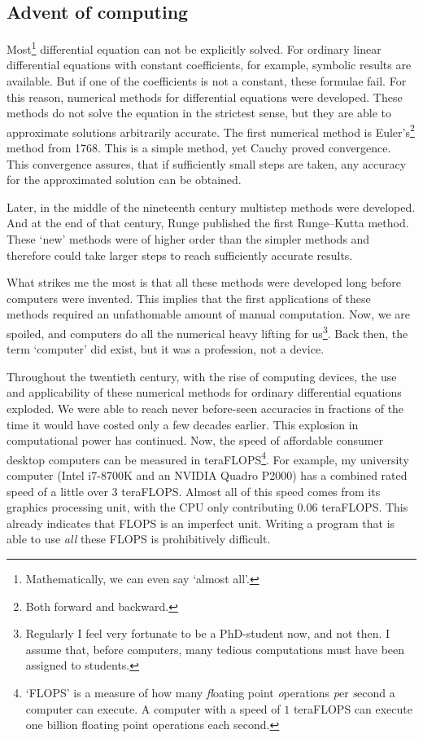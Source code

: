 \subsection{Advent of computing}

Most\footnote{Mathematically, we can even say `almost all'.} differential equation can not be explicitly solved. For ordinary linear differential equations with constant coefficients, for example, symbolic results are available. But if one of the coefficients is not a constant, these formulae fail. For this reason, numerical methods for differential equations were developed. These methods do not solve the equation in the strictest sense, but they are able to approximate solutions arbitrarily accurate. The first numerical method is Euler's\footnote{Both forward and backward.} method from 1768. This is a simple method, yet Cauchy proved convergence. This convergence assures, that if sufficiently small steps are taken, any accuracy for the approximated solution can be obtained.

Later, in the middle of the nineteenth century multistep methods were developed. And at the end of that century, Runge published the first Runge--Kutta method. These `new' methods were of higher order than the simpler methods and therefore could take larger steps to reach sufficiently accurate results.

What strikes me the most is that all these methods were developed long before computers were invented. This implies that the first applications of these methods required an unfathomable amount of manual computation. Now, we are spoiled, and computers do all the numerical heavy lifting for us\footnote{Regularly I feel very fortunate to be a PhD-student now, and not then. I assume that, before computers, many tedious computations must have been assigned to students.}. Back then, the term `computer' did exist, but it was a profession, not a device.

Throughout the twentieth century, with the rise of computing devices, the use and applicability of these numerical methods for ordinary differential equations exploded. We were able to reach never before-seen accuracies in fractions of the time it would have costed only a few decades earlier. This explosion in computational power has continued. Now, the speed of affordable consumer desktop computers can be measured in teraFLOPS\footnote{`FLOPS' is a measure of how many \emph{fl}oating point \emph{o}perations \emph{p}er \emph{s}econd a computer can execute. A computer with a speed of $1$ teraFLOPS can execute  one billion floating point operations each second.}. For example, my university computer (Intel i7-8700K and an NVIDIA Quadro P2000) has a combined rated speed of a little over 3 teraFLOPS. Almost all of this speed comes from its graphics processing unit, with the CPU only contributing $0.06$ teraFLOPS. This already indicates that FLOPS is an imperfect unit. Writing a program that is able to use \emph{all} these FLOPS is prohibitively difficult.

